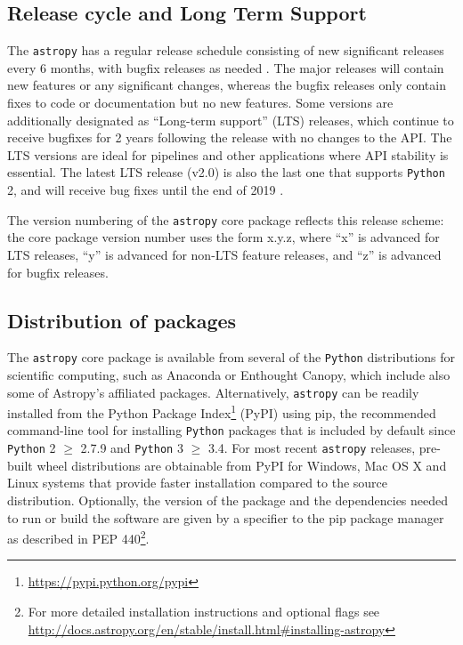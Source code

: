 \documentclass[modern]{aastex61}
\newcommand{\package}[1]{\texttt{#1}\xspace}
\newcommand{\python}{\package{Python}}
\newcommand{\astropy}{Astropy\xspace}
\newcommand{\astropypkg}{\package{astropy}}
\begin{document}

\subsection{Release cycle and Long Term Support}

The \astropypkg has a regular release schedule consisting of new significant
releases every 6 months, with bugfix releases as needed \citep{ape2}.
The major releases will contain new features or any significant changes, whereas
the bugfix releases only contain fixes to code or documentation but no new
features.
Some versions are additionally designated as ``Long-term support'' (LTS)
releases, which continue to receive bugfixes for 2 years following the release
with no changes to the API.
The LTS versions are ideal for pipelines and other applications where API
stability is essential.
The latest LTS release (v2.0) is also the last one that supports \python 2, and
will receive bug fixes until the end of 2019 \citep{ape10}.

The version numbering of the \astropypkg core package reflects this release
scheme: the core package version number uses the form x.y.z, where ``x'' is
advanced for LTS releases, ``y'' is advanced for non-LTS feature releases, and
``z'' is advanced for bugfix releases.

\subsection{Distribution of packages}

The \astropypkg core package is available from several of the \python distributions for scientific
%
%
computing, such as Anaconda or Enthought Canopy, which include also some of
\astropy's affiliated packages.
Alternatively, \astropypkg can be readily installed from the Python Package
Index\footnote{\url{https://pypi.python.org/pypi}} (PyPI) using pip, the
recommended command-line tool for installing \python packages
that is included by default since \python 2 $\geq$ 2.7.9 and \python 3 $\geq$ 3.4.
For most recent \astropypkg releases, pre-built wheel distributions are obtainable
from PyPI for Windows, Mac OS X and Linux systems that provide faster
installation compared to the source distribution.  Optionally, the version of
the package and the dependencies needed to run or build the software are given
by a specifier to the pip package manager as described in PEP 440\footnote{For
more detailed installation instructions and optional flags see
\url{http://docs.astropy.org/en/stable/install.html\#installing-astropy}}.
\end{document}
